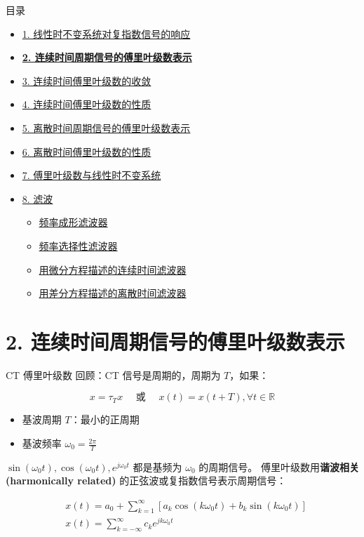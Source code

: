 \documentclass[
  ignorenonframetext,
]{beamer}
\providecommand{\tightlist}{%
  \setlength{\itemsep}{0pt}\setlength{\parskip}{0pt}}
\begin{document}
\begin{frame}{目录}
\protect{}\label{toc1}
\begin{itemize}
\tightlist
\item
  \hyperlink{sec31}{1. 线性时不变系统对复指数信号的响应}
\item
  \hyperlink{sec32}{\textbf{2. 连续时间周期信号的傅里叶级数表示}}
\item
  \hyperlink{sec33}{3. 连续时间傅里叶级数的收敛}
\item
  \hyperlink{sec34}{4. 连续时间傅里叶级数的性质}
\item
  \hyperlink{35}{5. 离散时间周期信号的傅里叶级数表示}
\item
  \hyperlink{sec36}{6. 离散时间傅里叶级数的性质}
\item
  \hyperlink{sec37}{7. 傅里叶级数与线性时不变系统}
\item
  \hyperlink{sec38}{8. 滤波}

  \begin{itemize}
  \tightlist
  \item
    \hyperlink{sec381}{频率成形滤波器}
  \item
    \hyperlink{sec382}{频率选择性滤波器}
  \item
    \hyperlink{sec383}{用微分方程描述的连续时间滤波器}
  \item
    \hyperlink{sec383}{用差分方程描述的离散时间滤波器}
  \end{itemize}
\end{itemize}
\end{frame}

\section{2. 连续时间周期信号的傅里叶级数表示}\label{sec32}

\begin{frame}{CT 傅里叶级数}
\protect{}\label{ct-ux5085ux91ccux53f6ux7ea7ux6570}
回顾：CT 信号是周期的，周期为 \(T\)，如果：

\[
x=\tau_{T} x \quad \text { 或 } \quad x(t)=x(t+T), \forall t \in \mathbb{R}
\]

\begin{itemize}
\tightlist
\item
  基波周期 \(T\)：最小的正周期
\item
  基波频率 \(\omega_{0}=\frac{2 \pi}{T}\)
\end{itemize}

\(\sin \left(\omega_{0} t\right), \cos \left(\omega_{0} t\right), e^{j \omega_{0} t}\)
都是基频为 \(\omega_{0}\) 的周期信号。 傅里叶级数用\textbf{谐波相关
(harmonically related)} 的正弦波或复指数信号表示周期信号：

\[
\begin{aligned}
& x(t)=a_{0}+\sum_{k=1}^{\infty}\left[a_{k} \cos \left(k \omega_{0} t\right)+b_{k} \sin \left(k \omega_{0} t\right)\right] \\
& x(t)=\sum_{k=-\infty}^{\infty} c_{k} e^{j k \omega_{0} t}
\end{aligned}
\]
\end{frame}
\end{document}
